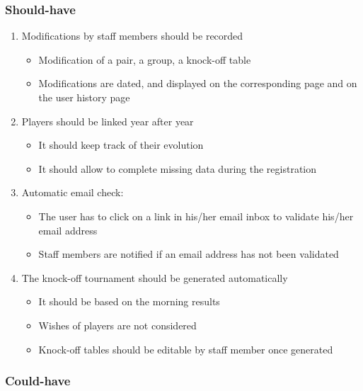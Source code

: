 \subsubsection{Should-have}

\begin{enumerate}
	\item Modifications by staff members should be recorded
		\begin{itemize}
			\item Modification of a pair, a group, a knock-off table
			\item Modifications are dated, and displayed on the corresponding page and on the user history page
		\end{itemize}
	\item Players should be linked year after year
		\begin{itemize}
			\item It should keep track of their evolution
			\item It should allow to complete missing data during the registration
		\end{itemize}
	\item Automatic email check:
		\begin{itemize}
			\item The user has to click on a link in his/her email inbox to validate his/her email address
			\item Staff members are notified if an email address has not been validated
		\end{itemize}
	\item The knock-off tournament should be generated automatically
		\begin{itemize}
			\item It should be based on the morning results
			\item Wishes of players are not considered
			\item Knock-off tables should be editable by staff member once generated
		\end{itemize}
\end{enumerate}

\subsubsection{Could-have}

